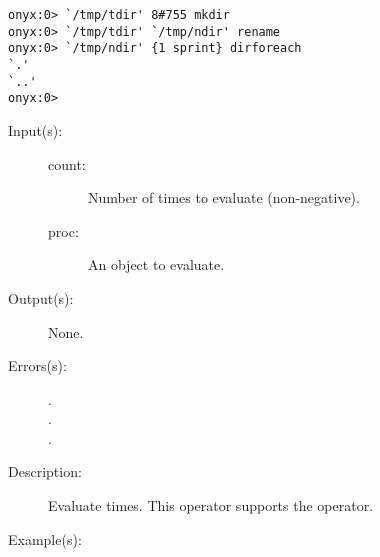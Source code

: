 \begin{description}
\begin{description}
\begin{verbatim}
onyx:0> `/tmp/tdir' 8#755 mkdir 
onyx:0> `/tmp/tdir' `/tmp/ndir' rename
onyx:0> `/tmp/ndir' {1 sprint} dirforeach
`.'
`..'
onyx:0>
		\end{verbatim}
	\end{description}
\label{systemdict:repeat}
\item[{\onyxop{count proc}{repeat}{--}}: ]
	\begin{description}\item[]
	\item[Input(s): ]
		\begin{description}\item[]
		\item[count: ]
			Number of times to evaluate  (non-negative).
		\item[proc: ]
			An object to evaluate.
		\end{description}
	\item[Output(s): ] None.
	\item[Errors(s): ]
		\begin{description}\item[]
		\item[.]
		\item[.]
		\item[.]
		\end{description}
	\item[Description: ]
		Evaluate   times.  This operator
		supports the 
		operator.
	\item[Example(s): ]\begin{verbatim}


\end{verbatim}
\end{description}
\end{description}
